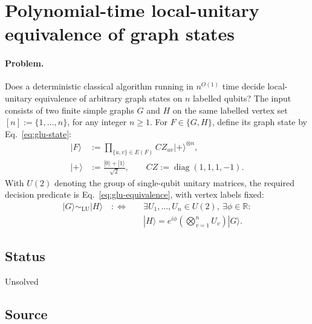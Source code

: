 \section{Polynomial-time local-unitary equivalence of graph states}
\label{sec:op_66affd4b198fd445}

\paragraph{Problem.}
Does a deterministic classical algorithm running in $n^{O(1)}$ time decide local-unitary equivalence of arbitrary graph states on $n$ labelled qubits? The input consists of two finite simple graphs $G$ and $H$ on the same labelled vertex set $[n]:=\{1,\ldots,n\}$, for any integer $n\geq1$. For $F\in\{G,H\}$, define its graph state by Eq.~\eqref{eq:glu-state}:
\begin{equation}
\begin{aligned}
|F\rangle&:=\prod_{\{u,v\}\in E(F)}CZ_{uv}|+\rangle^{\otimes n},\\
|+\rangle&:=\frac{|0\rangle+|1\rangle}{\sqrt2},
\qquad CZ:=\operatorname{diag}(1,1,1,-1).
\end{aligned}
\label{eq:glu-state}
\end{equation}
With $U(2)$ denoting the group of single-qubit unitary matrices, the required decision predicate is Eq.~\eqref{eq:glu-equivalence}, with vertex labels fixed:
\begin{equation}
\begin{aligned}
|G\rangle\sim_{\mathrm{LU}}|H\rangle
\quad:\Longleftrightarrow\quad
&\exists U_1,\ldots,U_n\in U(2),\ \exists\phi\in\mathbb R:\\
&|H\rangle=e^{i\phi}\left(\bigotimes_{v=1}^{n}U_v\right)|G\rangle.
\end{aligned}
\label{eq:glu-equivalence}
\end{equation}

\subsection*{Status}

Unsolved

\subsection*{Source}

